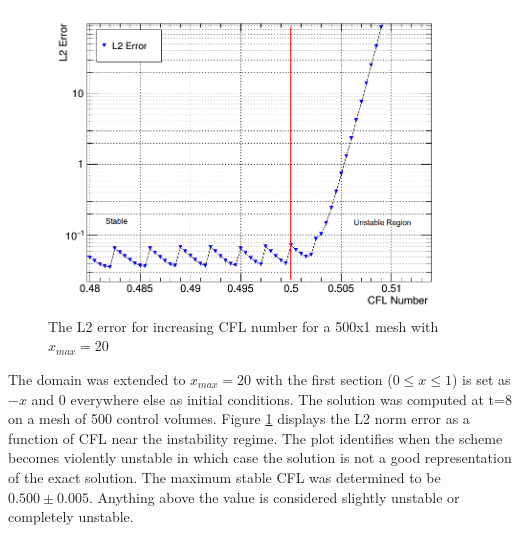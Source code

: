 \documentclass[paper=a4, fontsize=11pt, abstract=on]{scrartcl}
\numberwithin{equation}{section}		%
\numberwithin{figure}{section}			%
\numberwithin{table}{section}				%
\begin{document}
\begin{figure}[H]
\centering
\includegraphics[width=0.85\linewidth]{stabl2}
\caption{The L2 error for increasing CFL number for a 500x1 mesh with $x_{max} = 20$}
\label{stbl1}
\end{figure}

The domain was extended to $x_{max} =20$ with the first section ($0\leq x \leq 1 $) is set as $-x$ and 0 everywhere else as initial conditions. The solution was computed at t=8 on a mesh of 500 control volumes. Figure \ref{stbl1} displays the L2 norm error as a function of CFL near the instability regime. The plot identifies when the scheme becomes violently unstable in which case the solution is not a good representation of the exact solution. The maximum stable CFL was determined to be $0.500 \pm 0.005$. Anything above the value is considered slightly unstable or completely unstable.   
\end{document}
